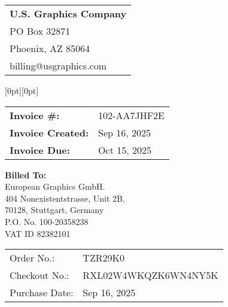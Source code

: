 \documentclass{article}
\newcounter{linenum}
\begin{document}
\noindent
\begin{tabular}[t]{@{}l@{}}
\textbf{U.S. Graphics Company} \\
PO Box 32871 \\
Phoenix, AZ 85064\\
billing@usgraphics.com\\
\end{tabular}%
\hfill%
\raisebox{\dimexpr-\height+\ht\strutbox}[0pt][0pt]{%
\begin{tabular}{|ll|}
\hline
\textbf{Invoice \#:} & 102-AA7JHF2E \\
\textbf{Invoice Created:} & Sep 16, 2025 \\
\textbf{Invoice Due:} & Oct 15, 2025 \\
\hline
\end{tabular}}

\vspace{20pt}

\noindent\textbf{Billed To:}\\
European Graphics GmbH.\\
404 Nonexistentstrasse, Unit 2B,\\
70128, Stuttgart, Germany\\
P.O. No. 100-20358238\\
VAT ID 82382101\\

\vspace{10pt}

\noindent
\begin{tabular}{@{}ll@{}}
Order No.: & TZR29K0 \\
Checkout No.: & RXL02W4WKQZK6WN4NY5K \\
Purchase Date: & Sep 16, 2025
\end{tabular}

\vspace{10pt}

\setcounter{linenum}{0}
\end{document}
